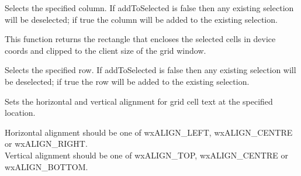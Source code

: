 \label{wxgridselectcol}


Selects the specified column. If addToSelected is false then any existing selection will be
deselected; if true the column will be added to the existing selection.



\label{wxgridselectiontodevicerect}


This function returns the rectangle that encloses the selected cells
in device coords and clipped to the client size of the grid window.



\label{wxgridselectrow}


Selects the specified row. If addToSelected is false then any existing selection will be
deselected; if true the row will be added to the existing selection.



\label{wxgridsetcellalignment}



Sets the horizontal and vertical alignment for grid cell text at the specified location.

Horizontal alignment should be one of wxALIGN\_LEFT, wxALIGN\_CENTRE or wxALIGN\_RIGHT. \\
Vertical alignment should be one of wxALIGN\_TOP, wxALIGN\_CENTRE or wxALIGN\_BOTTOM.



\label{wxgridsetcellbackgroundcolour}




\label{wxgridsetcelleditor}

